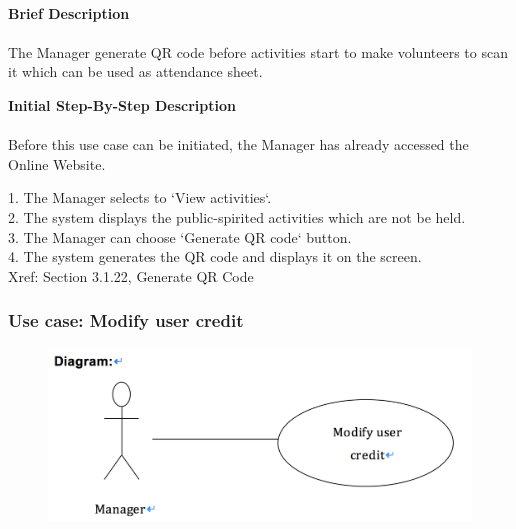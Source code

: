 \documentclass[12pt]{report}
\begin{document}
\paragraph{}
\begin{flushleft}
\textbf{Brief Description }
\paragraph{}
The Manager generate QR code before activities start to make volunteers to scan it which can be used as attendance sheet.\\

\begin{flushleft}
\textbf{Initial Step-By-Step Description }
\paragraph{}
Before this use case can be initiated, the Manager has already accessed the Online Website.

\begin{flushleft}
1.	The Manager selects to `View activities`. \\
2.	The system displays the public-spirited activities which are not be held. \\
3.	The Manager can choose `Generate QR code` button.  \\
4.	The system generates the QR code and displays it on the screen.  \\
Xref: Section 3.1.22, Generate QR Code
\end{flushleft}
\end{flushleft}
\end{flushleft}

\newpage
\subsubsection{Use case:  Modify user credit}

\begin{figure}[!htb]
  \includegraphics{29.PNG}
\end{figure}
\end{document}
